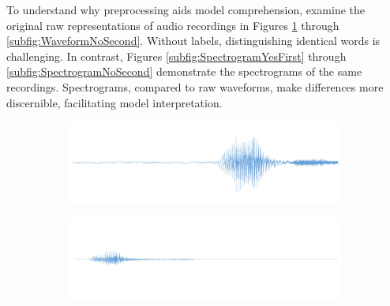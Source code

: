 To understand why preprocessing aids model comprehension, examine the original raw representations of audio recordings in Figures \ref{subfig:WaveformYesFirst} through \ref{subfig:WaveformNoSecond}. Without labels, distinguishing identical words is challenging. In contrast, Figures \ref{subfig:SpectrogramYesFirst} through \ref{subfig:SpectrogramNoSecond} demonstrate the spectrograms of the same recordings. Spectrograms, compared to raw waveforms, make differences more discernible, facilitating model interpretation.

\begin{figure}[h!]
	\centering
	
	\begin{subfigure}{0.45\textwidth}
		\includegraphics[width=\linewidth]{Images/DataMining/WaveformYesFirst.jpg}
		\caption{}    %
		\label{subfig:WaveformYesFirst}
	\end{subfigure}
	\hfill
	\begin{subfigure}{0.45\textwidth}
		\includegraphics[width=\linewidth]{Images/DataMining/WaveformYesSecond.jpg}
		\caption{}    %
		\label{subfig:WaveformYesSecond}
	\end{subfigure}
	
	\medskip 
	

\end{figure}
